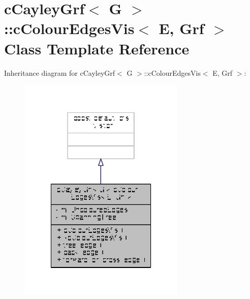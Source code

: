 \hypertarget{classcCayleyGrf_1_1cColourEdgesVis}{\section{c\-Cayley\-Grf$<$ G $>$\-:\-:c\-Colour\-Edges\-Vis$<$ E, Grf $>$ Class Template Reference}
\label{classcCayleyGrf_1_1cColourEdgesVis}
}


Inheritance diagram for c\-Cayley\-Grf$<$ G $>$\-:\-:c\-Colour\-Edges\-Vis$<$ E, Grf $>$\-:
\nopagebreak
\begin{figure}[H]
\begin{center}
\leavevmode
\includegraphics[width=226pt]{classcCayleyGrf_1_1cColourEdgesVis__inherit__graph}
\end{center}
\end{figure}


